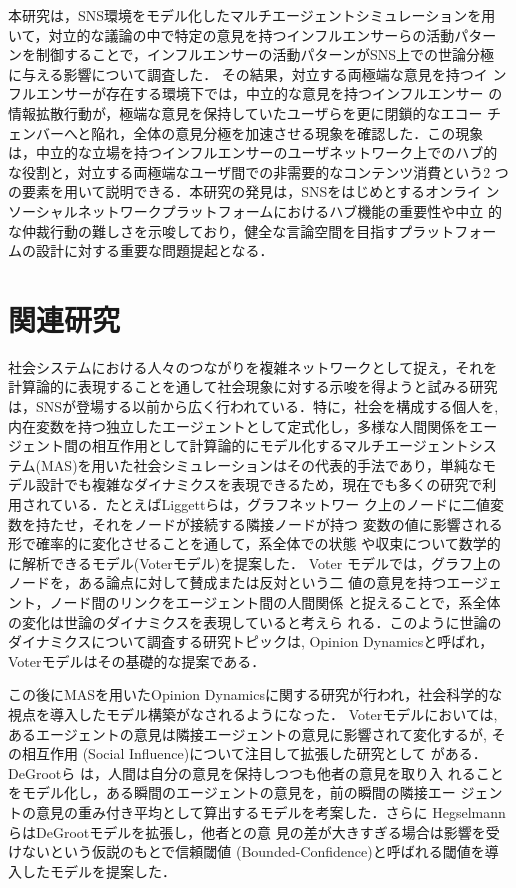 \documentclass[a4j]{ujarticle}
\begin{document}
本研究は，SNS環境をモデル化したマルチエージェントシミュレーションを用
いて，対立的な議論の中で特定の意見を持つインフルエンサーらの活動パター
ンを制御することで，インフルエンサーの活動パターンがSNS上での世論分極
に与える影響について調査した． その結果，対立する両極端な意見を持つイ
ンフルエンサーが存在する環境下では，中立的な意見を持つインフルエンサー
の情報拡散行動が，極端な意見を保持していたユーザらを更に閉鎖的なエコー
チェンバーへと陥れ，全体の意見分極を加速させる現象を確認した．この現象
は，中立的な立場を持つインフルエンサーのユーザネットワーク上でのハブ的
な役割と，対立する両極端なユーザ間での非需要的なコンテンツ消費という2
つの要素を用いて説明できる．本研究の発見は，SNSをはじめとするオンライ
ンソーシャルネットワークプラットフォームにおけるハブ機能の重要性や中立
的な仲裁行動の難しさを示唆しており，健全な言論空間を目指すプラットフォー
ムの設計に対する重要な問題提起となる．
\par

%

\section{関連研究}
社会システムにおける人々のつながりを複雑ネットワークとして捉え，それを
計算論的に表現することを通して社会現象に対する示唆を得ようと試みる研究
は，SNSが登場する以前から広く行われている．特に，社会を構成する個人を,
内在変数を持つ独立したエージェントとして定式化し，多様な人間関係をエー
ジェント間の相互作用として計算論的にモデル化するマルチエージェントシス
テム(MAS)を用いた社会シミュレーションはその代表的手法であり，単純なモ
デル設計でも複雑なダイナミクスを表現できるため，現在でも多くの研究で利
用されている．たとえばLiggettら\cite{Liggett1975}は，グラフネットワー
ク上のノードに二値変数を持たせ，それをノードが接続する隣接ノードが持つ
変数の値に影響される形で確率的に変化させることを通して，系全体での状態
や収束について数学的に解析できるモデル(Voterモデル)を提案した． Voter
モデルでは，グラフ上のノードを，ある論点に対して賛成または反対という二
値の意見を持つエージェント，ノード間のリンクをエージェント間の人間関係
と捉えることで，系全体の変化は世論のダイナミクスを表現していると考えら
れる．このように世論のダイナミクスについて調査する研究トピックは,
Opinion Dynamicsと呼ばれ，Voterモデルはその基礎的な提案である．
\par


この後にMASを用いたOpinion Dynamicsに関する研究が行われ，社会科学的な
視点を導入したモデル構築がなされるようになった． Voterモデルにおいては,
あるエージェントの意見は隣接エージェントの意見に影響されて変化するが,
その相互作用 (Social Influence)について注目して拡張した研究として
\cite{DeGroot1974,Friedkin1990,Hegselmann2002}がある． DeGrootら
\cite{DeGroot1974}は，人間は自分の意見を保持しつつも他者の意見を取り入
れることをモデル化し，ある瞬間のエージェントの意見を，前の瞬間の隣接エー
ジェントの意見の重み付き平均として算出するモデルを考案した．さらに
Hegselmannら\cite{Hegselmann2002}はDeGrootモデルを拡張し，他者との意
見の差が大きすぎる場合は影響を受けないという仮説のもとで信頼閾値
(Bounded-Confidence)と呼ばれる閾値を導入したモデルを提案した．
\par
\end{document}
